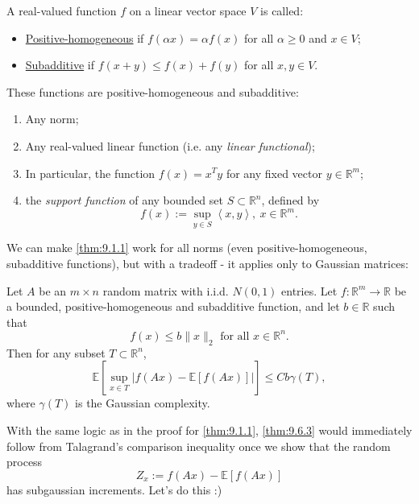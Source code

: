 \begin{definition}[]
\label{def:9.6.1}
A real-valued function $f$ on a linear vector space $V$ is called:
\begin{itemize}
	\item \underline{Positive-homogeneous} if $f(\alpha x) = \alpha f(x)$ for all $\alpha \geq 0$ and $x \in V$;
	\item \underline{Subadditive} if $f(x + y) \leq f(x) + f(y)$ for all $x, y \in V$.
\end{itemize}
\end{definition}

\begin{example}[]
\label{ex:9.6.2}
These functions are positive-homogeneous and subadditive:
\begin{enumerate}
	\item Any norm;
	\item Any real-valued linear function (i.e. any \textit{linear functional});
	\item In particular, the function $f(x) = x^T y$ for any fixed vector $y \in \mathbb{R}^m$;
	\item the \textit{support function} of any bounded set $S \subset \mathbb{R}^n$, defined by 
	\[ f(x) := \sup_{y \in S}\left\langle x, y \right\rangle, \ x \in \mathbb{R}^m. \]
\end{enumerate}
\end{example}

We can make \cref{thm:9.1.1} work for all norms (even positive-homogeneous, subadditive functions), but with a 
tradeoff - it applies only to Gaussian matrices:

\begin{theorem}
\label{thm:9.6.3}
Let $A$ be an $m \times n$ random matrix with i.i.d. $N(0, 1)$ entries. Let $f: \mathbb{R}^m \to \mathbb{R}$ be 
a bounded, positive-homogeneous and subadditive function, and let $b \in \mathbb{R}$ such that 
\[ f(x) \leq b \lVert x \rVert_{2} \text{ for all } x \in \mathbb{R}^n. \]
Then for any subset $T \subset \mathbb{R}^n$, 
\[ \mathbb{E}\left[ \sup_{x \in T} \left| f(Ax) - \mathbb{E}\left[ f(Ax) \right] \right| \right] 
\leq Cb \gamma(T), \]
where $\gamma(T)$ is the Gaussian complexity.
\end{theorem}

With the same logic as in the proof for \cref{thm:9.1.1}, \cref{thm:9.6.3} would immediately follow from 
Talagrand's comparison inequality once we show that the random process
\[ Z_x := f(Ax) - \mathbb{E}\left[ f(Ax) \right] \]
has subgaussian increments. Let's do this :)

